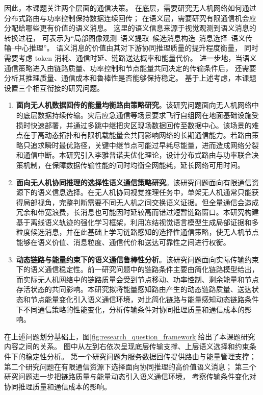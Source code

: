 因此，本课题关注两个层面的通信决策。
在底层，需要研究无人机网络如何通过分布式路由与功率控制保持数据连续回传；
在语义层，需要研究有限通信机会应分配给哪些更有价值的语义消息。
这里的语义信息来源于视觉观测到语义消息的转换过程，
可表示为“局部图像观测--语义提取--候选消息构造--消息选择--语义传输--中心推理”。
语义消息的价值由其对下游协同推理质量的提升程度衡量，
同时需要考虑 token 消耗、通信时延、链路送达概率和能量代价。
进一步地，当语义通信策略进入由链路质量、功率控制和节点能量共同决定的传输条件后，
还需要分析其推理质量、通信成本和鲁棒性是否能够保持稳定。
基于上述考虑，本课题设置三个相互衔接的研究问题。

\begin{enumerate}
\item \textbf{面向无人机数据回传的能量均衡路由策略研究}。该研究问题面向无人机网络中的底层数据持续传输。灾后应急通信等场景要求飞行自组网在地面基础设施受损时快速部署，并通过多跳中继把灾区现场数据回传至数据中心。该场景的难点在于高动态拓扑和有限机载能量会共同影响网络的长期通信能力。若路由策略只追求瞬时最优路径，关键中继节点可能过早耗尽能量，进而造成网络分裂和通信中断。本研究引入李雅普诺夫优化理论，设计分布式路由与功率联合决策机制，在保障数据传输性能的同时均衡全网能耗，延长网络可用时间。
\item \textbf{面向无人机协同推理的选择性语义通信策略研究}。该研究问题面向有限通信资源下的语义信息选择。在无人机协同视觉推理任务中，单架无人机通常只能获得局部视角，完整判断需要不同无人机之间交换语义证据。但全量通信会造成冗余和带宽浪费，长消息也可能因时延较高而错过短暂链路窗口。本研究构建基于离线语义轨迹的强化学习框架，利用冻结视觉语言模型生成局部证据和多粒度候选消息，并在此基础上学习链路感知的选择性通信策略，使无人机节点能够在语义价值、消息粒度、通信代价和送达可靠性之间进行权衡。
\item \textbf{动态链路与能量约束下的语义通信鲁棒性分析}。该研究问题面向实际传输约束下的语义通信稳定性。前一研究问题中的链路条件主要由简化链路模型给出，而实际无人机网络中的链路质量会受到节点移动、功率控制、剩余能量和节点存活状态的共同影响。本研究拟将能量感知路由产生的动态链路质量、送达状态和节点能量变化引入语义通信环境，对比简化链路与能量感知动态链路条件下不同通信策略的性能变化，分析传输条件对协同推理质量和通信成本的影响。
\end{enumerate}

在上述问题划分基础上，图\ref{fig:research_question_framework}给出了本课题研究内容之间的关系。
图中从左到右依次呈现底层传输支撑、上层语义选择和约束条件下的稳定性分析。
第一个研究问题为服务数据回传提供路由与能量管理支撑；
第二个研究问题在有限通信资源下选择面向协同推理的高价值语义消息；
第三个研究问题进一步把链路质量与能量动态引入语义通信环境，
考察传输条件变化对协同推理质量和通信成本的影响。

